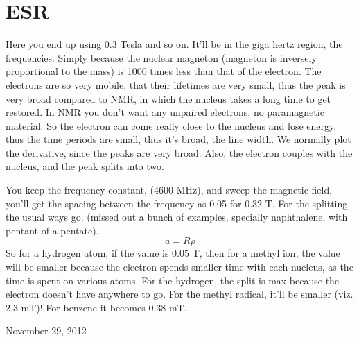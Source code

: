 \section{ESR}
	Here you end up using 0.3 Tesla and so on. It'll be in the giga hertz region, the frequencies. Simply because the nuclear magneton (magneton is inversely proportional to the mass) is 1000 times less than that of the electron. The electrons are so very mobile, that their lifetimes are very small, thus the peak is very broad compared to NMR, in which the nucleus takes a long time to get restored.
	In NMR you don't want any unpaired electrons, no paramagnetic material. So the electron can come really close to the nucleus and lose energy, thus the time periods are small, thus it's broad, the line width. We normally plot the derivative, since the peaks are very broad. Also, the electron couples with the nucleus, and the peak splits into two. 
	\par
	You keep the frequency constant, (4600 MHz), and sweep the magnetic field, you'll get the spacing between the frequency as 0.05 for 0.32 T.
	For the splitting, the usual ways go. (missed out a bunch of examples, specially naphthalene, with pentant of a pentate). 
	\begin{equation}
		a = R\rho
	\end{equation}
	So for a hydrogen atom, if the value is 0.05 T, then for a methyl ion, the value will be smaller because the electron spends smaller time with each nucleus, as the time is spent on various atoms. For the hydrogen, the split is max because the electron doesn't have anywhere to go. For the methyl radical, it'll be smaller (viz. 2.3 mT)! For benzene it becomes 0.38 mT.
\begin{flushright}
	November 29, 2012
\end{flushright}

